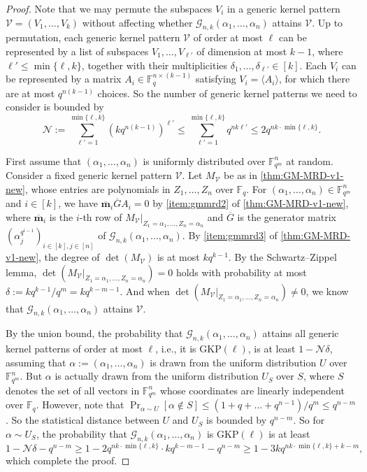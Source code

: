 \documentclass[11pt]{article}
\theoremstyle{plain}
\theoremstyle{definition}
\theoremstyle{remark}
\newcommand{\F}{\mathbb{F}}
\newcommand{\vm}{\bm{m}}
\def \mG {\mathcal{G}}
\begin{document}
\begin{proof}
Note that we may permute the subspaces $V_i$ in a generic kernel pattern $\mathcal{V}=(V_1,\dots,V_k)$ without affecting whether $\mG_{n,k}(\alpha_1,\dots, \alpha_n)$ attains $\mathcal{V}$.
Up to permutation, each generic kernel pattern $\mathcal{V}$ of order at most $\ell$ can be represented by a list of subspaces $V_1,\dots,V_{\ell'}$ of dimension at most $k-1$, where $\ell'\leq \min\{\ell,k\}$, together with their multiplicities $\delta_1,\dots,\delta_{\ell'}\in [k]$.
Each $V_i$ can be represented by a matrix $A_i\in\F_q^{n\times (k-1)}$ satisfying $V_i=\langle A_i\rangle$, for which there are at most $q^{n(k-1)}$ choices.
So the number of generic kernel patterns we need to consider is bounded by 
\[
\mathcal{N}:=\sum_{\ell'=1}^{\min\{\ell,k\}}(kq^{n(k-1)})^{\ell'}\leq \sum_{\ell'=1}^{\min\{\ell,k\}} q^{nk\ell'}\leq 2q^{nk\cdot\min\{\ell,k\}}.
\]

First assume that $(\alpha_1,\dots,\alpha_n)$ is uniformly distributed over $\F_{q^m}^n$ at random.
Consider a fixed generic kernel pattern $\mathcal{V}$. Let $M_{\mathcal{V}}$ be as in \cref{thm:GM-MRD-v1-new}, whose entries are polynomials in $Z_1,\dots,Z_n$ over $\F_q$.
For $(\alpha_1,\dots,\alpha_n)\in \F_{q^m}^n$ and $i\in [k]$, we have
$\overline{\vm}_i \overline{G} A_i=0$ by \cref{item:gmmrd2} of \cref{thm:GM-MRD-v1-new}, where $\overline{\vm}_i$ is the $i$-th row of $M_{\mathcal{V}}|_{Z_1=\alpha_1,\dots,Z_n=\alpha_n}$ and $\overline{G}$ is the generator matrix $\left(\alpha_j^{q^{i-1}}\right)_{i\in [k], j\in [n]}$ of $\mG_{n,k}(\alpha_1,\dots, \alpha_n)$. By \cref{item:gmmrd3} of \cref{thm:GM-MRD-v1-new}, the degree of $\det\left(M_{\mathcal{V}}\right)$ is at most $kq^{k-1}$.
By the Schwartz--Zippel lemma, $\det\left(M_{\mathcal{V}}|_{Z_1=\alpha_1,\dots,Z_n=\alpha_n}\right)=0$ holds with probability at most $\delta:=kq^{k-1}/q^m=kq^{k-m-1}$.
And when $\det\left(M_{\mathcal{V}}|_{Z_1=\alpha_1,\dots,Z_n=\alpha_n}\right)\neq 0$, we know that $\mG_{n,k}(\alpha_1,\dots, \alpha_n)$ attains $\mathcal{V}$.

By the union bound, the probability that $\mG_{n,k}(\alpha_1,\dots, \alpha_n)$ attains all generic kernel patterns of order at most $\ell$, i.e., it is $\mathrm{GKP}(\ell)$, is at least $1-\mathcal{N}\delta$, assuming that $\alpha:=(\alpha_1,\dots,\alpha_n)$ is drawn from the uniform distribution $U$ over $\F_{q^m}^n$.
But $\alpha$ is actually drawn from the uniform distribution $U_S$ over $S$, where $S$ denotes the set of all vectors in $\F_{q^m}^n$ whose coordinates are linearly independent over $\F_q$. However, note that $\Pr_{\alpha\sim U}[\alpha\not\in S]\leq (1+q+\dots+q^{n-1})/q^m\leq q^{n-m}$. So the statistical distance between $U$ and $U_S$ is bounded by $q^{n-m}$. So for $\alpha\sim U_S$, the probability that $\mG_{n,k}(\alpha_1,\dots, \alpha_n)$ is $\mathrm{GKP}(\ell)$ is at least 
\[
1-\mathcal{N}\delta-q^{n-m}
\geq 1-2q^{nk\cdot\min\{\ell,k\}}\cdot kq^{k-m-1}-q^{n-m}\geq 1-3k q^{nk\cdot\min\{\ell,k\}+k-m},
\]
which complete the proof.
\end{proof}
\end{document}
